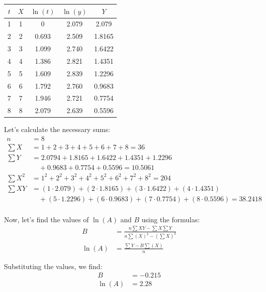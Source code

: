 \documentclass[12pt, a4paper]{article}
\numberwithin{equation}{section}
\begin{document}
\begin{table}[!ht]
    \centering
    \begin{tabular}{ccccc}
    \hline
        $t$ & $X$ & $\ln(t)$ & $\ln(y)$ & $Y$ \\ \hline
        1 & 1 & 0 & 2.079 & 2.079 \\ 
        2 & 2 & 0.693 & 2.509 & 1.8165 \\ 
        3 & 3 & 1.099 & 2.740 & 1.6422 \\
        4 & 4 & 1.386 & 2.821 & 1.4351 \\ 
        5 & 5 & 1.609 & 2.839 & 1.2296 \\ 
        6 & 6 & 1.792 & 2.760 & 0.9683 \\ 
        7 & 7 & 1.946 & 2.721 & 0.7754 \\ 
        8 & 8 & 2.079 & 2.639 & 0.5596 \\ \hline
    \end{tabular}
\end{table}

Let's calculate the necessary sums:
\begin{equation}
\begin{aligned}
n &= 8 \\
\sum X &= 1 + 2 + 3 + 4 + 5 + 6 + 7 + 8 = 36 \\
\sum Y &= 2.0794 + 1.8165 + 1.6422 + 1.4351 + 1.2296 \\
&\quad + 0.9683 + 0.7754 + 0.5596
 = 10.5061 \\
\sum X^2 &= 1^2 + 2^2 + 3^2 + 4^2 + 5^2 + 6^2 + 7^2 + 8^2 = 204 \\
\sum XY &= (1 \cdot 2.079) + (2 \cdot 1.8165) + (3 \cdot 1.6422) + (4 \cdot 1.4351) \\
&\quad + (5 \cdot 1.2296) + (6 \cdot 0.9683) + (7 \cdot 0.7754) + (8 \cdot 0.5596) = 38.2418 \\
\end{aligned}
\end{equation}

Now, let's find the values of $\ln(A)$ and $B$ using the formulas:
\begin{equation}
\begin{aligned}
B &= \frac{n\sum XY - \sum X \sum Y}{n\sum (X)^2 - (\sum X)^2} \\
\ln(A) &= \frac{\sum Y - B\sum (X)}{n}
\end{aligned}
\end{equation}


Substituting the values, we find:
\begin{equation}
\begin{aligned}
B &= - 0.215 \\
\ln(A) &= 2.28
\end{aligned}
\end{equation}
\end{document}
